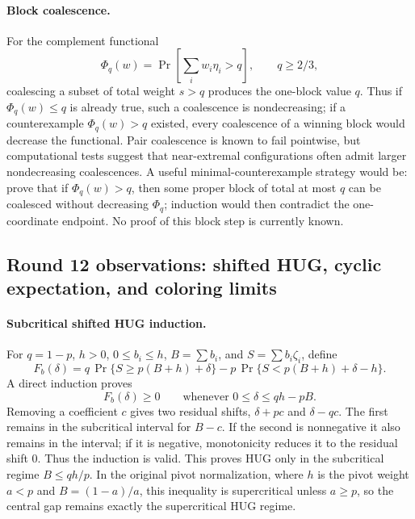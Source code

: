 \documentclass[12pt]{article}
\begin{document}
\paragraph{Block coalescence.}
For the complement functional
\[
 \Phi_q(w)=\Pr\left[\sum_iw_i\eta_i>q\right],\qquad q\ge2/3,
\]
coalescing a subset of total weight \(s>q\) produces the one-block value \(q\).
Thus if \(\Phi_q(w)\le q\) is already true, such a coalescence is
nondecreasing; if a counterexample \(\Phi_q(w)>q\) existed, every coalescence of
a winning block would decrease the functional.  Pair coalescence is known to
fail pointwise, but computational tests suggest that near-extremal
configurations often admit larger nondecreasing coalescences.  A useful
minimal-counterexample strategy would be: prove that if \(\Phi_q(w)>q\), then
some proper block of total at most \(q\) can be coalesced without decreasing
\(\Phi_q\); induction would then contradict the one-coordinate endpoint.  No
proof of this block step is currently known.



\subsection*{Round 12 observations: shifted HUG, cyclic expectation, and coloring limits}

\paragraph{Subcritical shifted HUG induction.}
For \(q=1-p\), \(h>0\), \(0\le b_i\le h\), \(B=\sum b_i\), and
\(S=\sum b_i\zeta_i\), define
\[
F_b(\delta)=
q\,\Pr\{S\ge p(B+h)+\delta\}
-p\,\Pr\{S<p(B+h)+\delta-h\}.
\]
A direct induction proves
\[
F_b(\delta)\ge0\qquad\text{whenever }0\le\delta\le qh-pB.
\]
Removing a coefficient \(c\) gives two residual shifts, \(\delta+pc\) and
\(\delta-qc\).  The first remains in the subcritical interval for \(B-c\).  If
the second is nonnegative it also remains in the interval; if it is negative,
monotonicity reduces it to the residual shift \(0\).  Thus the induction is
valid.  This proves HUG only in the subcritical regime \(B\le qh/p\).  In the
original pivot normalization, where \(h\) is the pivot weight \(a<p\) and
\(B=(1-a)/a\), this inequality is supercritical unless \(a\ge p\), so the
central gap remains exactly the supercritical HUG regime.
\end{document}
